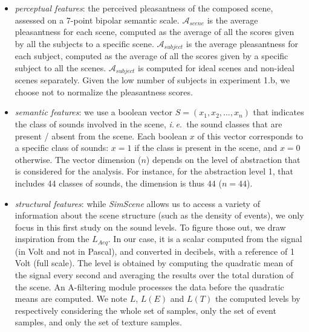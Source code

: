 \documentclass[12pt]{elsarticle}
\newcommand{\ie}{\emph{i.\,e.}}
\begin{document}
\begin{itemize}
\item \emph{perceptual features}: the perceived pleasantness of the composed scene, assessed on a 7-point bipolar semantic scale. $\mathcal{A}_{scene}$ is the average pleasantness for each scene, computed as the average of all the scores given by all the subjects to a specific scene. $\mathcal{A}_{subject}$ is the average pleasantness for each subject, computed as the average of all the scores given by a specific subject to all the scenes. $\mathcal{A}_{subject}$ is computed for ideal scenes and non-ideal scenes separately. Given the low number of subjects in experiment 1.b, we choose not to normalize the pleasantness scores. 

\item \emph{semantic features}: we use a boolean vector $S = (x_1, x_2, \ldots, x_n)$ that indicates the class of sounds involved in the scene, \ie~the sound classes that are present / absent from the scene. Each boolean $x$ of this vector corresponds to a specific class of sounds: $x = 1$ if the class is present in the scene, and $x = 0$ otherwise. The vector dimension ($n$) depends on the level of abstraction that is considered for the analysis. For instance, for the abstraction level 1, that includes 44 classes of sounds, the dimension is thus $44$ ($n = 44$).

\item \emph{structural features}: while \emph{SimScene} allows us to access a variety of information about the scene structure (such as the density of events), we only focus in this first study on the sound levels. To figure those out, we draw inspiration from the $L_{Aeq}$. In our case, it is a scalar computed from the signal (in Volt and not in Pascal), and converted in decibels, with a reference of 1 Volt (full scale). The level is obtained by computing the quadratic mean of the signal every second and averaging the results over the total duration of the scene. An A-filtering module processes the data before the quadratic means are computed. We note $L$, $L(E)$ and $L(T)$ the computed levels by respectively considering the whole set of samples, only the set of event samples, and only the set of texture samples.
\end{itemize}

\end{document}
